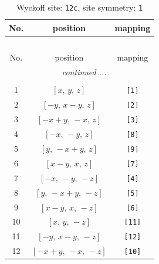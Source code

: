 \documentclass[fleqn,8pt]{jsarticle}
\begin{document}
\begin{longtable}{ccc}
\caption{Wyckoff site: {\tt 12c}, site symmetry: {\tt 1}}
 \\
 \hline \hline
No. & position & mapping \\ \hline \endfirsthead

\multicolumn{2}{l}{\tablename\ \thetable{}} \\
 \hline \hline
No. & position & mapping \\ \hline \endhead

 \hline \hline
\multicolumn{2}{r}{\footnotesize\it continued ...} \\ \endfoot

 \hline \hline
\multicolumn{2}{r}{} \\ \endlastfoot

1 & $\left[ x,\, y,\, z \right]$ & {\tt [1]} \\ \hline
2 & $\left[ - y,\, x - y,\, z \right]$ & {\tt [2]} \\ \hline
3 & $\left[ - x + y,\, - x,\, z \right]$ & {\tt [3]} \\ \hline
4 & $\left[ - x,\, - y,\, z \right]$ & {\tt [8]} \\ \hline
5 & $\left[ y,\, - x + y,\, z \right]$ & {\tt [9]} \\ \hline
6 & $\left[ x - y,\, x,\, z \right]$ & {\tt [7]} \\ \hline
7 & $\left[ - x,\, - y,\, - z \right]$ & {\tt [4]} \\ \hline
8 & $\left[ y,\, - x + y,\, - z \right]$ & {\tt [5]} \\ \hline
9 & $\left[ x - y,\, x,\, - z \right]$ & {\tt [6]} \\ \hline
10 & $\left[ x,\, y,\, - z \right]$ & {\tt [11]} \\ \hline
11 & $\left[ - y,\, x - y,\, - z \right]$ & {\tt [12]} \\ \hline
12 & $\left[ - x + y,\, - x,\, - z \right]$ & {\tt [10]} \\
\end{longtable}
\end{document}
